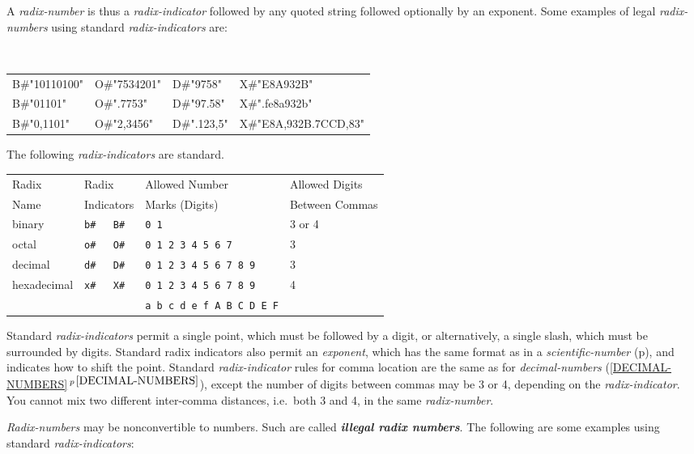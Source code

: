 \documentclass[12pt]{article}
\newcommand{\skey}[2]{{\bf \em #1#2}\index{#1}}
\newcommand{\secref}[1]{\ref{#1}$\,^{p\,\pageref{#1}}$}
\newcommand{\pagref}[1]{p\pageref{#1}}
\newenvironment{indpar}[1][0.3in]%
	{\begin{list}{}%
		     {\setlength{\itemsep}{0in}%
		      \setlength{\topsep}{0in}%
		      \setlength{\parsep}{1ex}%
		      \setlength{\labelwidth}{#1}%
		      \setlength{\leftmargin}{#1}%
		      \addtolength{\leftmargin}{\labelsep}}%
	 \item}%
	{\end{list}}
\begin{document}
A {\em radix-number} is thus a {\em radix-indicator} followed by
any quoted string followed optionally by an exponent.
Some examples of legal {\em radix-numbers}
using standard {\em radix-indicators} are:

\begin{indpar}[0.1in]
\tt
\begin{tabular}{l@{~~~~~}l@{~~~~~}l@{~~~~~}l}
B\#"10110100"	& O\#"7534201" & D\#"9758"	& X\#"E8A932B" \\
B\#"01101"	& O\#".7753"   & D\#"97.58"	& X\#".fe8a932b" \\
B\#"0,1101"	& O\#"2,3456"  & D\#".123,5"	& X\#"E8A,932B.7CCD,83" \\
\end{tabular}
\end{indpar}

The following {\em radix-indicators} are standard.

\begin{center}
\begin{tabular}{l@{~~~~~}l@{~~~~~}l@{~~~~~}l}
Radix	& Radix		 & Allowed Number	& Allowed Digits \\
Name	& Indicators     & Marks (Digits)	& Between Commas \\[1ex]
binary	& \tt b\#~~~B\#	 & \tt 0 1		& 3 or 4 \\
octal	& \tt o\#~~~O\#	 & \tt 0 1 2 3 4 5 6 7	& 3 \\
decimal	& \tt d\#~~~D\#	 & \tt 0 1 2 3 4 5 6 7 8 9
						& 3 \\
hexadecimal
	& \tt x\#~~~X\#	 & \tt 0 1 2 3 4 5 6 7 8 9
						& 4 \\
	&		 & \tt a b c d e f A B C D E F
\end{tabular}
\end{center}

Standard {\em radix-indicators} permit a single point, which must
be followed by a digit, or alternatively, a single slash, which must
be surrounded by digits.  Standard radix indicators also permit an
{\em exponent}, which has the same format as in a
{\em scientific-number} (\pagref{SCIENTIFIC-NUMBER}), and indicates
how to shift the point.
Standard {\em radix-indicator}
rules for comma location are the same as for {\em decimal-numbers}
(\secref{DECIMAL-NUMBERS}), except the number of digits between commas may
be 3 or 4, depending on the {\em radix-indicator}.  You cannot mix two
different inter-comma distances, i.e.~both 3 and 4,
in the same {\em radix-number}.

{\em Radix-numbers} may be nonconvertible to numbers.  Such are
called \skey{illegal radix number}s.  The following are some examples
using standard {\em radix-indicators}:
\end{document}
